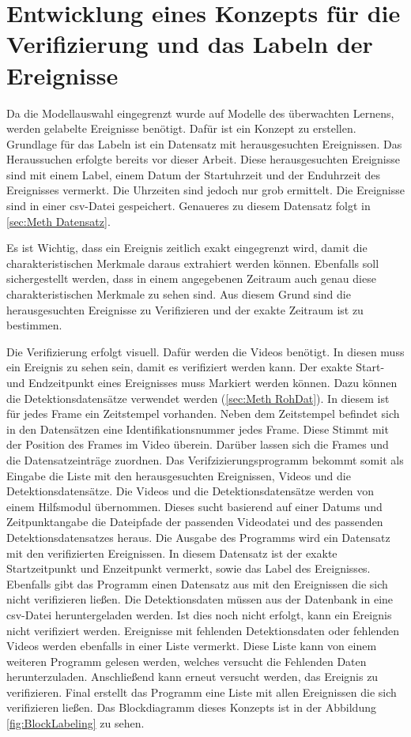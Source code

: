 \section{Entwicklung eines Konzepts für die Verifizierung und das Labeln der Ereignisse} \label{sec:Meth Labeling}
Da die Modellauswahl eingegrenzt wurde auf Modelle des überwachten Lernens, werden gelabelte Ereignisse benötigt. Dafür ist ein Konzept zu erstellen. Grundlage für das Labeln ist ein Datensatz mit herausgesuchten Ereignissen. Das Heraussuchen erfolgte bereits vor dieser Arbeit. Diese herausgesuchten Ereignisse sind mit einem Label, einem Datum der Startuhrzeit und der Enduhrzeit des Ereignisses vermerkt. Die Uhrzeiten sind jedoch nur grob ermittelt. Die Ereignisse sind in einer csv-Datei gespeichert. Genaueres zu diesem Datensatz folgt in  \ref{sec:Meth Datensatz}. \par

Es ist Wichtig, dass ein Ereignis zeitlich exakt eingegrenzt wird, damit die charakteristischen Merkmale daraus extrahiert werden können. Ebenfalls soll sichergestellt werden, dass in einem angegebenen Zeitraum auch genau diese charakteristischen Merkmale zu sehen sind. Aus diesem Grund sind die herausgesuchten Ereignisse zu Verifizieren und der exakte Zeitraum ist zu bestimmen. \par 

Die Verifizierung erfolgt visuell. Dafür werden die Videos benötigt. In diesen muss ein Ereignis zu sehen sein, damit es verifiziert werden kann. Der exakte Start- und Endzeitpunkt eines Ereignisses muss Markiert werden können. Dazu können die Detektionsdatensätze verwendet werden (\ref{sec:Meth RohDat}). In diesem ist für jedes Frame ein Zeitstempel vorhanden. Neben dem Zeitstempel befindet sich in den Datensätzen eine Identifikationsnummer jedes Frame. Diese Stimmt mit der Position des Frames im Video überein. Darüber lassen sich die Frames und die Datensatzeinträge zuordnen. Das Verifzizierungsprogramm bekommt somit als Eingabe die Liste mit den herausgesuchten Ereignissen, Videos und die Detektionsdatensätze. Die Videos und die Detektionsdatensätze werden von einem Hilfsmodul übernommen. Dieses sucht basierend auf einer Datums und Zeitpunktangabe die Dateipfade der passenden Videodatei und des passenden Detektionsdatensatzes heraus. Die Ausgabe des Programms wird ein Datensatz mit den verifizierten Ereignissen. In diesem Datensatz ist der exakte Startzeitpunkt und Enzeitpunkt vermerkt, sowie das Label des Ereignisses. Ebenfalls gibt das Programm einen Datensatz aus mit den Ereignissen die sich nicht verifizieren ließen. Die Detektionsdaten müssen aus der Datenbank in eine csv-Datei heruntergeladen werden. Ist dies noch nicht erfolgt, kann ein Ereignis nicht verifiziert werden. Ereignisse mit fehlenden Detektionsdaten oder fehlenden Videos werden ebenfalls in einer Liste vermerkt. Diese Liste kann von einem weiteren Programm gelesen werden, welches versucht die Fehlenden Daten herunterzuladen. Anschließend kann erneut versucht werden, das Ereignis zu verifizieren. Final erstellt das Programm eine Liste mit allen Ereignissen die sich verifizieren ließen. Das Blockdiagramm dieses Konzepts ist in der Abbildung \ref{fig:BlockLabeling} zu sehen. 

